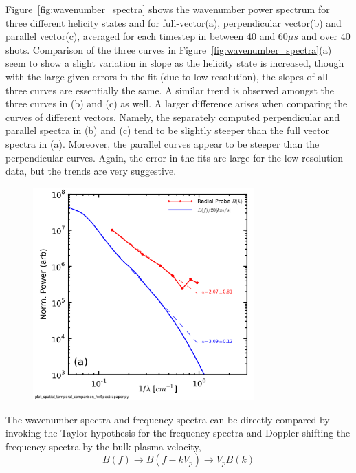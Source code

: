 \documentclass[aip,prl,amsmath,amssymb,reprint,superscriptaddress]{revtex4-1} %
\begin{document}
Figure~\ref{fig:wavenumber_spectra} shows the wavenumber power spectrum for three different helicity states and for full-vector(a), perpendicular vector(b) and parallel vector(c), averaged for each timestep in between 40 and 60$\mu s$ and over 40 shots. Comparison of the three curves in Figure~\ref{fig:wavenumber_spectra}(a) seem to show a slight variation in slope as the helicity state is increased, though with the large given errors in the fit (due to low resolution), the slopes of all three curves are essentially the same. A similar trend is observed amongst the three curves in (b) and (c) as well. A larger difference arises when comparing the curves of different vectors. Namely, the separately computed perpendicular and parallel spectra in (b) and (c) tend to be slightly steeper than the full vector spectra in (a). Moreover, the parallel curves appear to be steeper than the perpendicular curves. Again, the error in the fits are large for the low resolution data, but the trends are very suggestive.

\begin{figure}[!htbp]
\centerline{
\includegraphics[width=8.5cm]{B_spatial_temporal_comp_wFits_40t60us}}
\caption{\label{fig:wavenumber_comp}}
\end{figure}

The wavenumber spectra and frequency spectra can be directly compared by invoking the Taylor hypothesis for the frequency spectra and Doppler-shifting the frequency spectra by the bulk plasma velocity,
\begin{equation}
B(f) \longrightarrow B(f-kV_{p}) \longrightarrow V_{p}B(k)
\label{eq:Taylor_Hyp}
\end{equation}
\end{document}
